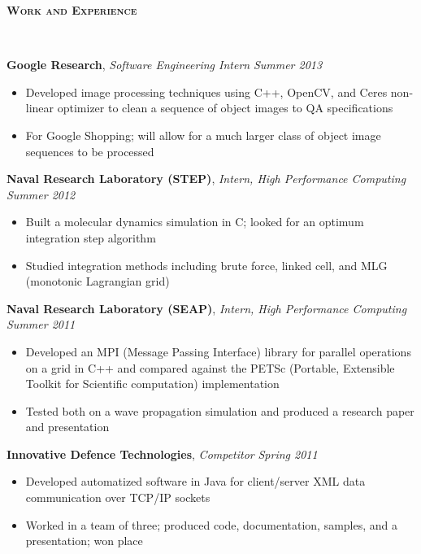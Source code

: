 \documentclass{article}
\newenvironment{changemargin}[2]{%
  \begin{list}{}{%
    \setlength{\topsep}{0pt}%
    \setlength{\leftmargin}{#1}%
    \setlength{\rightmargin}{#2}%
    \setlength{\listparindent}{\parindent}%
    \setlength{\itemindent}{\parindent}%
    \setlength{\parsep}{\parskip}%
  }%
  \item[]}{\end{list}
}
\newcommand{\lineover}{
	\begin{changemargin}{-0.05in}{-0.05in}
		\vspace*{-8pt}
		\hrulefill \\
		\vspace*{-2pt}
	\end{changemargin}
}
\newcommand{\header}[1]{
	\begin{changemargin}{-0.5in}{-0.5in}
		{\large \textbf{\scshape{#1}}}\\
  	\lineover
	\end{changemargin}
}
\newenvironment{body} {
	\vspace*{-16pt}
	\begin{changemargin}{-0.25in}{-0.5in}
  }	
	{\end{changemargin}
}
\begin{document}
\smallskip


\header{Work and Experience}

\begin{body}
	\vspace{14pt}
	\textbf{Google Research}, \emph{Software Engineering Intern} \hfill \emph{Summer 2013}\\
	\vspace*{-4pt}
	\begin{itemize}
		\item Developed image processing techniques using C++, OpenCV, and Ceres non-linear optimizer to clean a sequence of object images to QA specifications
		\item For Google Shopping; will allow for a much larger class of object image sequences to be processed
	\end{itemize}

	\medskip

	\textbf{Naval Research Laboratory (STEP)}, \emph{Intern, High Performance Computing} \hfill \emph{Summer 2012}\\
	\vspace*{-4pt}
	\begin{itemize}
		\item Built a molecular dynamics simulation in C; looked for an optimum integration step algorithm
		\item Studied integration methods including brute force, linked cell, and MLG (monotonic Lagrangian grid)
	\end{itemize}
	
	\medskip

	\textbf{Naval Research Laboratory (SEAP)}, \emph{Intern, High Performance Computing} \hfill \emph{Summer 2011}\\
	\vspace*{-4pt}
	\begin{itemize}
		\item Developed an MPI (Message Passing Interface) library for parallel operations on a grid in C++ and compared against the PETSc (Portable, Extensible Toolkit for Scientific computation) implementation
		\item Tested both on a wave propagation simulation and produced a research paper and presentation
	\end{itemize}	
	
	\medskip
	
	\textbf{Innovative Defence Technologies}, \emph{Competitor} \hfill \emph{Spring 2011}\\
	\vspace*{-4pt}
	\begin{itemize}
		\item Developed automatized software in Java for client/server XML data communication over TCP/IP sockets
		\item Worked in a team of three; produced code, documentation, samples, and a presentation; won  place
	\end{itemize}
\end{body}
\end{document}
